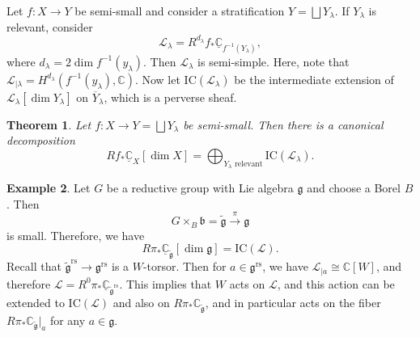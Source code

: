 \documentclass{amsart}
\newtheorem{thm}{Theorem}[section]
\theoremstyle{definition}
\newtheorem{exm}[thm]{Example}
\theoremstyle{remark}
\theoremstyle{plain}
\theoremstyle{definition}
\theoremstyle{remark}
\newcommand{\C}{\mathbb{C}}
\newcommand{\g}{\mathfrak{g}}
\renewcommand{\b}{\mathfrak{b}}
\newcommand{\mc}[1]{\mathcal{#1}}
\newcommand{\mr}[1]{\mathrm{#1}}
\newcommand{\on}[1]{\operatorname{#1}}
\newcommand{\ol}[1]{\overline{#1}}
\newcommand{\ul}[1]{\underline{#1}}
\newcommand{\1}{\mathbf{1}}
\newcommand{\2}{\mathbf{2}}
\newcommand{\3}{\mathbf{3}}
\begin{document}
Let \(f \colon X \to Y\) be semi-small and consider a stratification \(Y = \bigsqcup Y_{\lambda}\). If \(Y_{\lambda}\) is relevant, consider
\[ \mc{L}_{\lambda} = R^{d_{\lambda}} f_* \ul{\C}_{f^{-1}(Y_{\lambda})}, \]
where \(d_{\lambda} = 2 \dim f^{-1} (y_{\lambda})\). Then \(\mc{L}_{\lambda}\) is semi-simple. Here, note that \(\mc{L}_{|\lambda} = H^{d_{\lambda}}(f^{-1}(y_{\lambda}), \C)\). Now let \(\mr{IC}(\mc{L}_{\lambda})\) be the intermediate extension of \(\mc{L}_{\lambda}[\dim Y_{\lambda}]\) on \(\ol{Y}_{\lambda}\), which is a perverse sheaf.

\begin{thm}
    Let \(f \colon X \to Y = \bigsqcup Y_{\lambda}\) be semi-small. Then there is a canonical decomposition
    \[ R f_* \ul{\C}_X[\dim X] = \bigoplus_{Y_{\lambda}\text{ relevant}} \mr{IC}(\mc{L}_{\lambda}). \]
\end{thm}

\begin{exm}
    Let \(G\) be a reductive group with Lie algebra \(\g\) and choose a Borel \(B\). Then
    \[ G \times_B \b = \tilde{\g} \xrightarrow{\pi} \g \]
    is small. Therefore, we have
    \[ R \pi_* \ul{\C}_{\tilde{\g}} [\dim \g] = \mr{IC}(\mc{L}). \]
    Recall that \(\tilde{\g}^{\on{rs}} \to \g^{\on{rs}}\) is a \(W\)-torsor. Then for \(a \in \g^{\on{rs}}\), we have \(\mc{L}_{|a} \cong \C[W]\), and therefore \(\mc{L} = R^0 \pi_* \ul{\C}_{\tilde{\g}^{\on{rs}}}\). This implies that \(W\) acts on \(\mc{L}\), and this action can be extended to \(\mr{IC}(\mc{L})\) and also on \(R \pi_* \C_{\tilde{\g}}\), and in particular acts on the fiber \(R \pi_* \C_{\tilde{\g}}|_a\) for any \(a \in \g\).
\end{exm}
\end{document}
